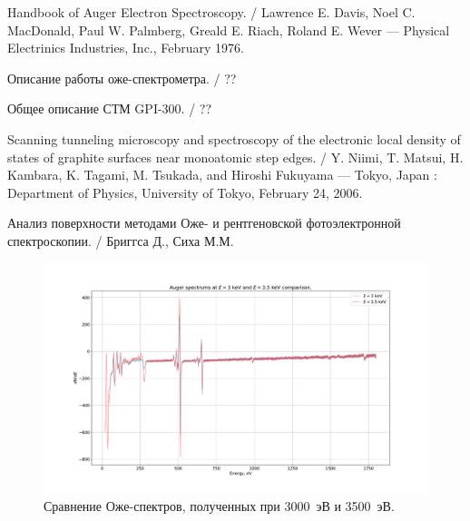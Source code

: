 \documentclass[a4paper, 12pt]{article}
\begin{document}
\newpage

\begin{thebibliography}{2}
	
	 Handbook of Auger Electron Spectroscopy. /  Lawrence E. Davis, Noel C. MacDonald, Paul W. Palmberg, Greald E. Riach, Roland E. Wever --- Physical Electrinics Industries, Inc., February 1976.
	
	 Описание работы оже-спектрометра. / ??
	
	 Общее описание СТМ GPI-300. / ??
	
	 Scanning tunneling microscopy and spectroscopy of the electronic local density of states of graphite surfaces near monoatomic step edges. / Y. Niimi, T. Matsui, H. Kambara, K. Tagami, M. Tsukada, and Hiroshi Fukuyama --- Tokyo, Japan : Department of Physics, University of Tokyo, February 24, 2006.
	
	 Анализ поверхности методами Оже- и рентгеновской фотоэлектронной спектроскопии. / Бриггса Д., Сиха М.М.
	
\end{thebibliography}


\newpage


\begin{figure}[H]
	\centering
	\includegraphics[width=1.3\linewidth, angle=-90]{1_Auge_double}
	\caption{Сравнение Оже-спектров, полученных при 3000~эВ и 3500~эВ.}
	\label{fig:1_Auge_double}
\end{figure}

\newpage
\end{document}
